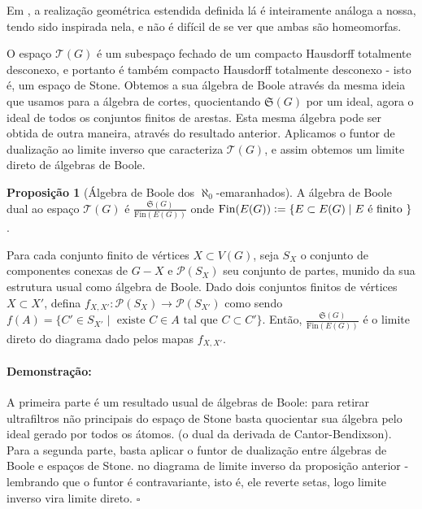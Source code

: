 \documentclass[11pt]{article}
\newcommand{\defeq}{\vcentcolon=}
\newcommand{\pulinho}{\vspace{.5cm}}
\theoremstyle{definition}
\theoremstyle{definition}
\theoremstyle{definition}
\newtheorem{prop}{Proposição}
\newenvironment{proposicao}{
\definecolor{shadecolor}{HTML}{FFDBDF}
\begin{shaded}
\begin{prop}
}
{
\end{prop}
\end{shaded}
}
\theoremstyle{definition}
\theoremstyle{definition}
\theoremstyle{definition}
\theoremstyle{definition}
\theoremstyle{definition}
\theoremstyle{definition}
\theoremstyle{definition}
\theoremstyle{definition}
\theoremstyle{definition}
\newenvironment{prova}{\paragraph{Demonstração:}}{\hfill$\square$ 
\pulinho
}
\begin{document}
Em \cite{Diestel2017}, a realização geométrica estendida definida lá é inteiramente análoga a nossa, tendo sido inspirada nela, e não é difícil de se ver que ambas são homeomorfas. 

\pulinho

O espaço $\mathcal{T}(G)$ é um subespaço fechado de um compacto Hausdorff totalmente desconexo, e portanto é também compacto Hausdorff totalmente desconexo - isto é, um espaço de Stone. Obtemos a sua álgebra de Boole através da mesma ideia que usamos para a álgebra de cortes, quocientando $\mathfrak{S}(G)$ por um ideal, agora o ideal de todos os conjuntos finitos de arestas. Esta mesma álgebra pode ser obtida de outra maneira, através do resultado anterior. Aplicamos o funtor de dualização ao limite inverso que caracteriza $\mathcal{T}(G)$, e assim obtemos um limite direto de álgebras de Boole.

\begin{proposicao}[Álgebra de Boole dos $\aleph_0$-emaranhados]
    A álgebra de Boole dual ao espaço $\mathcal{T}(G)$ é $\frac{\mathfrak{S}(G)}{\text{Fin}(E(G))}$ onde $\text{Fin}(E(G)) \defeq \{E \subset E(G) \mid E \text{ é finito }\}$. 
    
    \pulinho
    Para cada conjunto finito de vértices $X \subset V(G)$, seja $S_X$ o conjunto de componentes conexas de $G - X$ e $\mathcal{P}(S_X)$ seu conjunto de partes, munido da sua estrutura usual como álgebra de Boole. Dado dois conjuntos finitos de vértices $X \subset X'$, defina $f_{X,X'}: \mathcal{P}(S_X) \rightarrow \mathcal{P}(S_{X'})$ como sendo $f(A) = \{C' \in S_{X'} \mid \text{ existe } C \in A \text{ tal que } C \subset C' \}$. Então, $\frac{\mathfrak{S}(G)}{\text{Fin}(E(G))}$ é o limite direto do diagrama dado pelos mapas $f_{X,X'}$.
\end{proposicao}
\begin{prova}
    A primeira parte é um resultado usual de álgebras de Boole: para retirar ultrafiltros não principais do espaço de Stone basta quocientar sua álgebra pelo ideal gerado por todos os átomos. (o dual da derivada de Cantor-Bendixson). Para a segunda parte, basta aplicar o funtor de dualização entre álgebras de Boole e espaços de Stone. no diagrama de limite inverso da proposição anterior - lembrando que o funtor é contravariante, isto é, ele reverte setas, logo limite inverso vira limite direto.
\end{prova}



\end{document}
